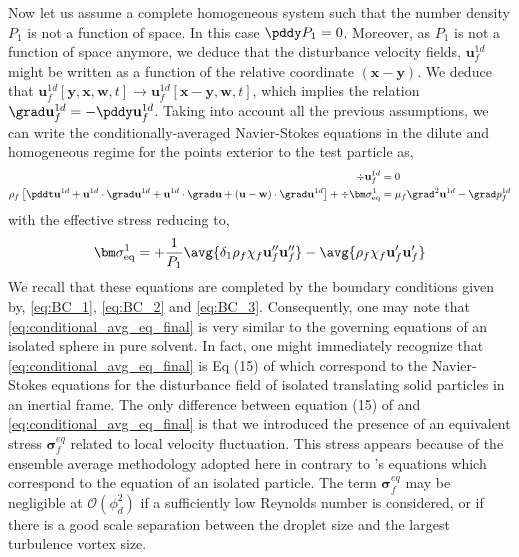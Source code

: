 Now let us assume a complete homogeneous system such that the number density $P_1$ is not a function of space. 
In this case $\pddy P_1 = 0$.
Moreover, as $P_1$ is not a function of space anymore, we deduce that the disturbance velocity fields, $\textbf{u}_f^{1d}$ might be written as a function of the relative coordinate $(\textbf{x} - \textbf{y})$. 
We deduce that $\textbf{u}_f^{1d}[\textbf{y},\textbf{x},\textbf{w},t] \to \textbf{u}_f^{1d}[\textbf{x}-\textbf{y},\textbf{w},t]$, which implies the relation  $\grad \textbf{u}_f^{1d} = - \pddy \textbf{u}^{1d}_f$.
Taking into account all the previous assumptions, we can write the conditionally-averaged Navier-Stokes equations in the dilute and homogeneous regime for the points exterior to the test particle as, 
\begin{align}
    \div \textbf{u}^{1d}_f &= 0 \\
    \rho_f \left[
        \pddt \textbf{u}^{1d}
        + \textbf{u}^{1d}\cdot \grad\textbf{u}^{1d} 
        +  \textbf{u}^{1d}\cdot \grad\textbf{u} 
        +  (\textbf{u} - \textbf{w})\cdot \grad\textbf{u}^{1d}
    \right]
    + \div \bm\sigma^1_\text{eq}
    &=
        \mu_f \grad^2 \textbf{u}^{1d}  
        - \grad p_f^{1d} 
    \label{eq:conditional_avg_eq_final}
\end{align}
with the effective stress reducing to,
\begin{equation*}
    \bm\sigma^1_\text{eq}
    =
    + \frac{1}{P_1}\avg{\delta_1\rho_f\chi_f\textbf{u}_f''\textbf{u}_f''}
    - \avg{\rho_f\chi_f\textbf{u}_f'\textbf{u}_f'}
\end{equation*}
We recall that these equations are completed by the boundary conditions given by, \ref{eq:BC_1}, \ref{eq:BC_2} and \ref{eq:BC_3}.
Consequently, one may note that \ref{eq:conditional_avg_eq_final} is very similar to the governing equations of an isolated sphere in pure solvent. 
In fact, one might immediately recognize that \ref{eq:conditional_avg_eq_final} is Eq (15) of \citep{maxey1983equation} which correspond to the Navier-Stokes equations for the disturbance field of isolated translating solid particles in an inertial frame. 
The only difference between equation (15) of \citep{maxey1983equation} and \ref{eq:conditional_avg_eq_final} is that we introduced the presence of an equivalent stress $\bm\sigma_f^{eq}$ related to local velocity fluctuation. 
This stress appears because of the ensemble average methodology adopted here in contrary to \citep{maxey1983equation}'s equations which correspond to the equation of an isolated particle. 
The term $\bm\sigma_f^{eq}$ may be negligible at $\mathcal{O}(\phi_d^2)$ if a sufficiently low Reynolds number is considered, or if there is a good scale separation between the droplet size and the largest turbulence vortex size. 




